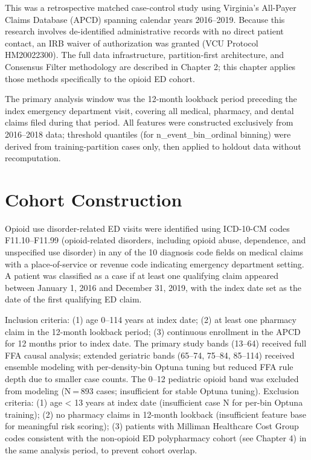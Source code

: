 \documentclass[
  12pt,
]{book}
\begin{document}
This was a retrospective matched case-control study using Virginia's
All-Payer Claims Database (APCD) spanning calendar years 2016--2019.
Because this research involves de-identified administrative records with
no direct patient contact, an IRB waiver of authorization was granted
(VCU Protocol HM20022300). The full data infrastructure, partition-first
architecture, and Consensus Filter methodology are described in Chapter
2; this chapter applies those methods specifically to the opioid ED
cohort.

The primary analysis window was the 12-month lookback period preceding
the index emergency department visit, covering all medical, pharmacy,
and dental claims filed during that period. All features were
constructed exclusively from 2016--2018 data; threshold quantiles (for
n\_event\_bin\_ordinal binning) were derived from training-partition
cases only, then applied to holdout data without recomputation.

\section{Cohort Construction}\label{sec-cohort}

Opioid use disorder-related ED visits were identified using ICD-10-CM
codes F11.10--F11.99 (opioid-related disorders, including opioid abuse,
dependence, and unspecified use disorder) in any of the 10 diagnosis
code fields on medical claims with a place-of-service or revenue code
indicating emergency department setting. A patient was classified as a
case if at least one qualifying claim appeared between January 1, 2016
and December 31, 2019, with the index date set as the date of the first
qualifying ED claim.

Inclusion criteria: (1) age 0--114 years at index date; (2) at least one
pharmacy claim in the 12-month lookback period; (3) continuous
enrollment in the APCD for 12 months prior to index date. The primary
study bands (13--64) received full FFA causal analysis; extended
geriatric bands (65--74, 75--84, 85--114) received ensemble modeling
with per-density-bin Optuna tuning but reduced FFA rule depth due to
smaller case counts. The 0--12 pediatric opioid band was excluded from
modeling (N = 893 cases; insufficient for stable Optuna tuning).
Exclusion criteria: (1) age \textless{} 13 years at index date
(insufficient case N for per-bin Optuna training); (2) no pharmacy
claims in 12-month lookback (insufficient feature base for meaningful
risk scoring); (3) patients with Milliman Healthcare Cost Group codes
consistent with the non-opioid ED polypharmacy cohort (see Chapter 4) in
the same analysis period, to prevent cohort overlap.
\end{document}
